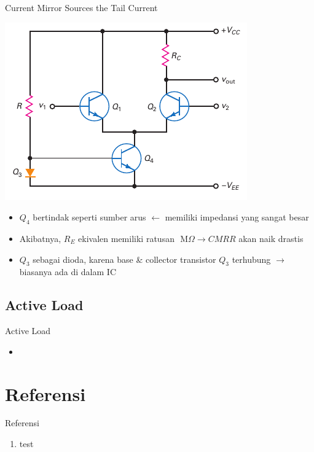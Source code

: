 \documentclass[aspectratio=169]{beamer}
\begin{document}
\begin{frame}{Current Mirror Sources the Tail Current}
	\begin{multicols}{2}
		\begin{center}
			\includegraphics[height=0.6\textheight]{gambar/01.diff-amp/01.fig29}
		\end{center}
		\columnbreak
		\begin{itemize}
			\item $ Q_4 $ bertindak seperti sumber arus $ \leftarrow $ memiliki impedansi yang sangat besar
			\item Akibatnya, $ R_E $ ekivalen memiliki ratusan $ \text{ M}\Omega \rightarrow CMRR $ akan naik drastis
			\item $ Q_3 $ sebagai dioda, karena base \& collector transistor $ Q_3 $ terhubung $ \rightarrow $ biasanya ada di dalam IC
		\end{itemize}
	\end{multicols}
\end{frame}

\subsection{Active Load}
\begin{frame}{Active Load}
	\begin{itemize}
		\item 
	\end{itemize}
\end{frame}


\section{Referensi}
\begin{frame}{Referensi}
	\begin{enumerate}
		\item test
	\end{enumerate}
\end{frame}
\end{document}
